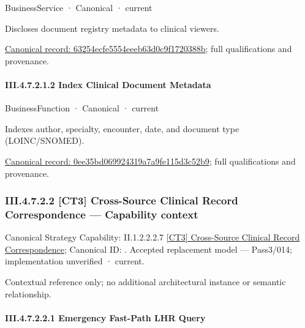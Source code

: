 \label{element:63254ecfe5554eeeb63d0c9f1720388b}
{\small BusinessService · Canonical · current}\par

Discloses document registry metadata to clinical viewers.


{\footnotesize \href{../../../../../../../../continuum/business/business-service/63254ecfe5554eeeb63d0c9f1720388b.md}{Canonical record: 63254ecfe5554eeeb63d0c9f1720388b}; full qualifications and provenance.}\par
\paragraph*{III.4.7.2.1.2 Index Clinical Document Metadata}
\label{navigation:III.4.7.2.1.2}

\label{element:0ee35bd069924319a7a9fe115d3c52b9}
{\small BusinessFunction · Canonical · current}\par

Indexes author, specialty, encounter, date, and document type (LOINC/SNOMED).


{\footnotesize \href{../../../../../../../../continuum/business/business-function/0ee35bd069924319a7a9fe115d3c52b9.md}{Canonical record: 0ee35bd069924319a7a9fe115d3c52b9}; full qualifications and provenance.}\par
\subsubsection*{III.4.7.2.2 [CT3] Cross-Source Clinical Record Correspondence — Capability context}
\label{navigation:III.4.7.2.2}

{\small Canonical Strategy Capability: II.1.2.2.2.7 \hyperref[element:08c8d56f6a1c45b4919e9579b3f695a0]{[CT3] Cross-Source Clinical Record Correspondence}; Canonical ID: \texttt{}. Accepted replacement model — Pass3/014; implementation unverified · current.}\par
Contextual reference only; no additional architectural instance or semantic relationship.\par
\paragraph*{III.4.7.2.2.1 Emergency Fast-Path LHR Query}
\label{navigation:III.4.7.2.2.1}

